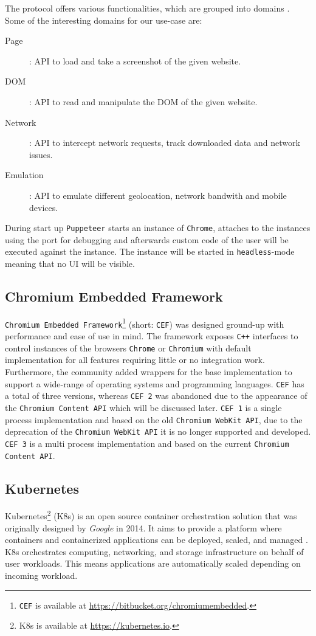 The protocol offers various functionalities, which are grouped into domains \cite{DevToolsProtocol}. Some of the interesting domains for our use-case are:
\begin{description}
	\item[Page]: API to load and take a screenshot of the given website.
	\item[DOM]: API to read and manipulate the DOM of the given website.
	\item[Network]: API to intercept network requests, track downloaded data and network issues.
	\item[Emulation]: API to emulate different geolocation, network bandwith and mobile devices.
\end{description}

During start up \texttt{Puppeteer} starts an instance of \texttt{Chrome}, attaches to the instances using the port for debugging and afterwards custom code of the user will be executed against the instance. The instance will be started in \texttt{headless}-mode meaning that no UI will be visible.

\subsection{Chromium Embedded Framework}
\label{cef}
\texttt{Chromium Embedded Framework}\footnote{\texttt{CEF} is available at \url{https://bitbucket.org/chromiumembedded}.} (short: \texttt{CEF}) was designed ground-up with performance and ease of use in mind. The framework exposes \texttt{C++} interfaces to control instances of the browsers \texttt{Chrome} or \texttt{Chromium} with default implementation for all features requiring little or no integration work. Furthermore, the community added wrappers for the base implementation to support a wide-range of operating systems and programming languages.
\texttt{CEF} has a total of three versions, whereas \texttt{CEF 2} was abandoned due to the appearance of the \texttt{Chromium Content API} which will be discussed later. \texttt{CEF 1} is a single process implementation and based on the old \texttt{Chromium WebKit API}, due to the deprecation of the \texttt{Chromium WebKit API} it is no longer supported and developed. \texttt{CEF 3} is a multi process implementation and based on the current \texttt{Chromium Content API}.

\subsection{Kubernetes}
\label{k8s}
Kubernetes\footnote{K8s is available at \url{https://kubernetes.io}.} (K8s) is an open source container orchestration solution that was originally designed by \textit{Google} in 2014. It aims to provide a platform where containers and containerized applications can be deployed, scaled, and managed \cite{Wikik8s}. K8s orchestrates computing, networking, and storage infrastructure on behalf of user workloads. This means applications are automatically scaled depending on incoming workload.

